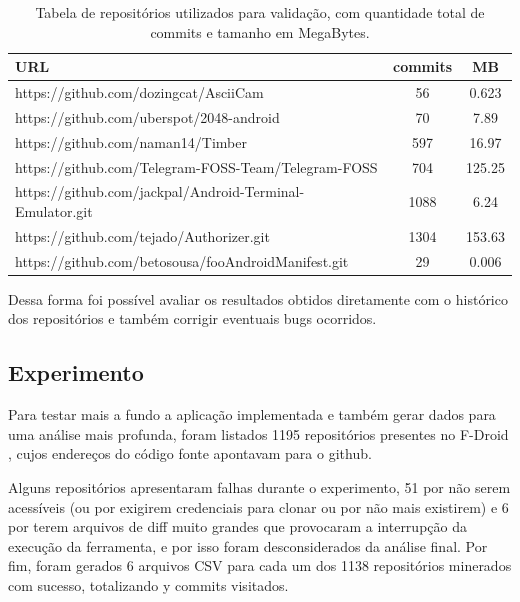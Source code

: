\documentclass[a4paper,12pt]{article}
\numberwithin{figure}{section}
\begin{document}
\begin{table}[h]
\begin{center}
\begin{tabular}{l|c|c}

 URL & commits & MB\\
\hline
https://github.com/dozingcat/AsciiCam & 56 & 0.623  \\
https://github.com/uberspot/2048-android & 70 & 7.89 \\
https://github.com/naman14/Timber & 597 & 16.97  \\
https://github.com/Telegram-FOSS-Team/Telegram-FOSS & 704 & 125.25  \\
https://github.com/jackpal/Android-Terminal-Emulator.git & 1088 & 6.24 \\
https://github.com/tejado/Authorizer.git & 1304 & 153.63 \\
https://github.com/betosousa/fooAndroidManifest.git & 29 & 0.006
\end{tabular}
\caption{Tabela de repositórios utilizados para validação, com quantidade total de commits e tamanho em MegaBytes.}
\end{center}
\end{table}


Dessa forma foi possível avaliar os resultados obtidos diretamente com o histórico dos repositórios e também corrigir eventuais bugs ocorridos.


\subsection{Experimento}%

Para testar mais a fundo a aplicação implementada e também gerar dados para uma análise  mais profunda, foram listados 1195 repositórios presentes no F-Droid \cite{fdroid}, cujos endereços do código fonte apontavam para o github.

Alguns repositórios apresentaram falhas durante o experimento, 51 por não serem acessíveis (ou por exigirem credenciais para clonar ou por não mais existirem) e 6 por terem arquivos de diff muito grandes que provocaram a interrupção da execução da ferramenta, e por isso foram desconsiderados da análise final. Por fim, foram gerados 6 arquivos CSV para cada um dos 1138 repositórios minerados com sucesso, totalizando y commits visitados.
\end{document}
